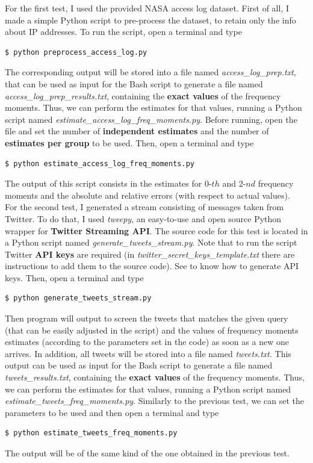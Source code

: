 \noindent For the first test, I used the provided NASA access log dataset\cite{nasa}. First of all, I made a simple Python script to pre-process the dataset, to retain only the info about IP addresses. To run the script, open a terminal and type
\begin{lstlisting}
$ python preprocess_access_log.py
\end{lstlisting}
The corresponding output will be stored into a file named \textit{access\_log\_prep.txt}, that can be used as input for the Bash script to generate a file named \textit{access\_log\_prep\_results.txt}, containing the \textbf{exact values} of the frequency moments.
Thus, we can perform the estimates for that values, running a Python script named \textit{estimate\_access\_log\_freq\_moments.py}. Before running, open the file and set the number of \textbf{independent estimates} and the number of \textbf{estimates per group} to be used. Then, open a terminal and type
\begin{lstlisting}
$ python estimate_access_log_freq_moments.py
\end{lstlisting}
The output of this script consists in the estimates for $0\text{-}th$ and $2\text{-}nd$ frequency moments and the absolute and relative errors (with respect to actual values).\\

\noindent For the second test, I generated a stream consisting of messages taken from Twitter. To do that, I used \textit{tweepy}\cite{tweepy}, an easy-to-use and open source Python wrapper for \textbf{Twitter Streaming API}\cite{twitter}. The source code for this test is located in a Python script named \textit{generate\_tweets\_stream.py}. Note that to run the script Twitter \textbf{API keys} are required (in \textit{twitter\_secret\_keys\_template.txt} there are instructions to add them to the source code). See \cite{twitter} to know how to generate API keys. Then, open a terminal and type
\begin{lstlisting}
$ python generate_tweets_stream.py
\end{lstlisting}
Then program will output to screen the tweets that matches the given query (that can be easily adjusted in the script) and the values of frequency moments estimates (according to the parameters set in the code) as soon as a new one arrives.
In addition, all tweets will be stored into a file named \textit{tweets.txt}. This output can be used as input for the Bash script to generate a file named \textit{tweets\_results.txt}, containing the \textbf{exact values} of the frequency moments.
Thus, we can perform the estimates for that values, running a Python script named \textit{estimate\_tweets\_freq\_moments.py}. Similarly to the previous test, we can set the parameters to be used and then open a terminal and type
\begin{lstlisting}
$ python estimate_tweets_freq_moments.py
\end{lstlisting}
The output will be of the same kind of the one obtained in the previous test.



